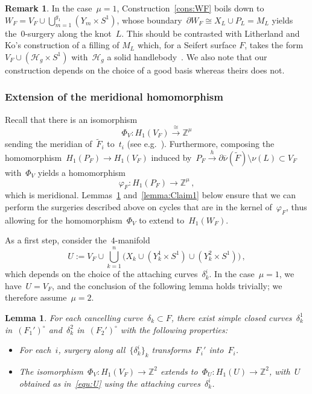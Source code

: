 \documentclass[10.9pt,a4paper]{amsart}
\newtheorem{lemma}[theorem]{Lemma}
\theoremstyle{definition}
\newtheorem{remark}[theorem]{Remark}
\theoremstyle{remark}
\newcommand{\Z}{\mathbb{Z}}
\newcommand{\onu}{\overline{\nu}}
\begin{document}
\medskip

\begin{remark}
\label{rem:KoComparison}
In the case~$\mu=1$,  Construction~\ref{cons:WF} boils down to~$W_F=V_F\cup\bigcup_{m=1}^{g_1}\left(Y_m\times S^1\right)$, whose boundary~$\partial W_F\cong X_L\cup P_L=M_L$ yields the~$0$-surgery along the knot~$L$.
This should be contrasted with Litherland and Ko's construction of a filling of $M_L$ which, for a Seifert surface $F$, takes the form~$V_F \cup (\mathcal{H}_g \times S^1)$ with~$\mathcal{H}_g$ a solid handlebody~\cite{LitherlandCobordism,Ko2}.
We also note that our construction depends on the choice of a good basis whereas theirs does not.
\end{remark}


\subsubsection*{Extension of the meridional homomorphism}
Recall that there is an isomorphism 
\[
\Phi_V\colon H_1(V_F) \stackrel{\cong}{\longrightarrow} \Z^\mu
\]
sending the meridian of~$\tilde F_i$ to~$t_i$ (see e.g.~\cite[Proposition 3.1]{CFT18}).
Furthermore, composing the homomorphism~$H_1(P_F)\to H_1(V_F)$ induced by~$P_F \stackrel{h}{\to}\partial \onu(\tilde{F}) \setminus \nu(L)\subset V_F$ with~$\Phi_V$ yields a homomorphism
\begin{equation}
\label{equ:phiF}
\varphi_F \colon H_1(P_F) \to \Z^\mu\,,
\end{equation}
which is meridional.
Lemmas~\ref{lemma:Claim0} and~\ref{lemma:Claim1} below ensure that we can perform the surgeries described above
on cycles that are in the kernel of~$\varphi_F$, thus allowing for the homomorphism~$\Phi_V$ to extend to~$H_1(W_F)$.

As a first step, consider the~$4$-manifold
\begin{equation}
\label{equ:U}
U:=V_F \cup \bigcup_{k=1}^n \Big(X_k \cup \left(Y_k^1 \times S^1\right)\cup \left(Y_k^2 \times S^1\right)\Big)\,,
\end{equation}
which depends on the choice of the attaching curves~$\delta_k^i$. In the case~$\mu=1$, we have~$U=V_F$, and
the conclusion of the following lemma holds trivially; we therefore assume~$\mu=2$.

\begin{lemma}
\label{lemma:Claim0}
For each cancelling curve~$\delta_k \subset F$, there exist simple closed curves~$\delta_k^1$ in~$(F_1')^\circ$ and~$\delta_k^2$ in~$(F_2')^\circ$ with the following properties:
\begin{itemize}
\item For each~$i$, surgery along all~$\{\delta_k^i\}_k$ transforms~$F_i'$ into~$F_i$.
\item The isomorphism~$\Phi_V\colon H_1(V_F)\to\Z^2$ extends to~$\Phi_U\colon H_1(U)\to\Z^2$, with~$U$
obtained as in~\eqref{equ:U} using the attaching curves~$\delta_k^i$.
\end{itemize}
\end{lemma}
\end{document}
